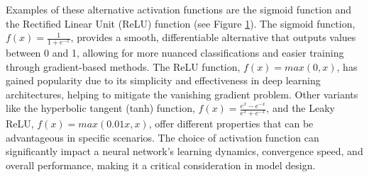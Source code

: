 Examples of these alternative activation functions are the sigmoid function and the Rectified Linear Unit (ReLU) function (see Figure \ref{fig:activationFunctions}). The sigmoid function, $f(x)=\frac{1}{1+e^{-x}}$, provides a smooth, differentiable alternative that outputs values between 0 and 1, allowing for more nuanced classifications and easier training through gradient-based methods. The ReLU function, $f(x)=max(0,x)$, has gained popularity due to its simplicity and effectiveness in deep learning architectures, helping to mitigate the vanishing gradient problem. Other variants like the hyperbolic tangent (tanh) function, $f(x)=\frac{e^x-e^{-x}}{e^x+e^{-x}}$, and the Leaky ReLU, $f(x)=max(0.01x,x)$, offer different properties that can be advantageous in specific scenarios. The choice of activation function can significantly impact a neural network's learning dynamics, convergence speed, and overall performance, making it a critical consideration in model design.

\begin{figure}[h]
\begin{tcolorbox}[every float=\centering, drop shadow, title=Activation Functions ,colback=white,colframe=WMgreen,
  colbacktitle=WMgreen,]
  

  \label{fig:activationFunctions}
 \end{tcolorbox}
\end{figure}


